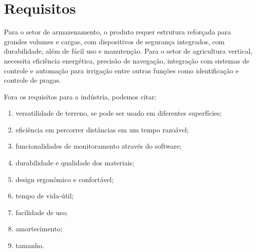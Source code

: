 \section{Requisitos}

Para o setor de armazenamento, o produto requer estrutura reforçada para grandes
volumes e cargas, com dispositivos de segurança integrados, com durabilidade,
além de fácil uso e manutenção. Para o setor de agricultura vertical, necessita
eficiência energética, precisão de navegação, integração com sistemas de
controle e automação para irrigação entre outras funções como identificação e
controle de pragas. 

Fora os requisitos para a indústria, podemos citar:

\begin{enumerate}
  \item versatilidade de terreno, se pode ser usado em diferentes superfícies;
  \item eficiência em percorrer distâncias em um tempo razoável;
  \item funcionalidades de monitoramento através do software;
  \item durabilidade e qualidade dos materiais;
  \item design ergonômico e confortável;
  \item tempo de vida-útil;
  \item facilidade de uso;
  \item amortecimento;
  \item tamanho.
\end{enumerate}
